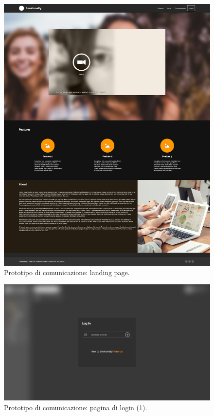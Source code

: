 
\begin{figure}[H]
	\centering
	\caption{Prototipo di comunicazione: landing page.}
	\label{fig:prototipo-comunicazione:landing-page}
	\includegraphics[width=\textwidth]{images/prototipo-comunicazione/Landing.png}
\end{figure}

\begin{figure}[H]
	\centering
	\caption{Prototipo di comunicazione: pagina di login (1).}
	\label{fig:prototipo-comunicazione:login-1}
	\includegraphics[width=\textwidth]{images/prototipo-comunicazione/login (1).png}
\end{figure}

